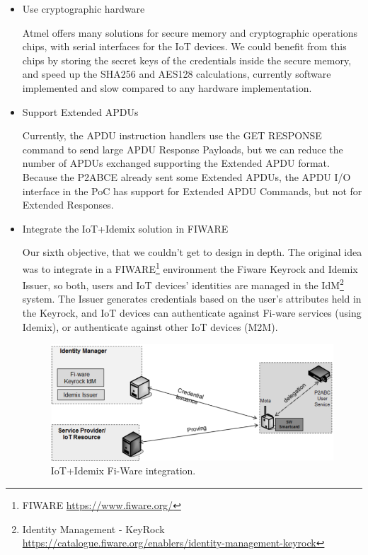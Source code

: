 \begin{itemize}
	
	\item Use cryptographic hardware
	
	Atmel offers many solutions for secure memory and cryptographic operations chips, with serial interfaces for the IoT devices. We could benefit from this chips by storing the secret keys of the credentials inside the secure memory, and speed up the SHA256 and AES128 calculations, currently software implemented and slow compared to any hardware implementation. 
	
	
	
	\item Support Extended APDUs
	
	Currently, the APDU instruction handlers use the GET RESPONSE command to send large APDU Response Payloads, but we can reduce the number of APDUs exchanged supporting the Extended APDU format. Because the P2ABCE already sent some Extended APDUs, the APDU I/O interface in the PoC has support for Extended APDU Commands, but not for Extended Responses.
	
	\item Integrate the IoT+Idemix solution in FIWARE
	
	Our sixth objective, that we couldn't get to design in depth. The original idea was to integrate in a FIWARE\footnote{FIWARE \url{https://www.fiware.org/}} environment the Fiware Keyrock and Idemix Issuer, so both, users and IoT devices' identities are managed in the IdM\footnote{Identity Management - KeyRock \url{https://catalogue.fiware.org/enablers/identity-management-keyrock}} system. The Issuer generates credentials based on the user’s attributes held in the Keyrock, and IoT devices can authenticate against Fi-ware services (using Idemix), or authenticate against other IoT devices (M2M).
	
	\begin{figure}[bth]
		\begin{center}
			\includegraphics[width=0.8\linewidth]{gfx/fiware}
		\end{center}
		\caption{IoT+Idemix Fi-Ware integration.}
		\label{fig:fiware}
	\end{figure}


\end{itemize}
